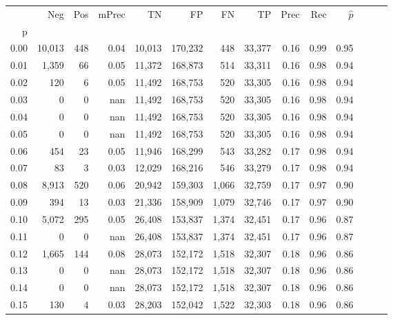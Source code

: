 \begin{tabular}{rrrrrrrrrrrrrr}
\toprule
{} &     Neg &    Pos & mPrec &       TN &       FP &      FN &      TP &  Prec &   Rec & $\hat{p}$ \\
p    &         &        &       &          &          &         &         &       &       &           \\
\midrule
0.00 &  10,013 &    448 &  0.04 &   10,013 &  170,232 &     448 &  33,377 &  0.16 &  0.99 &      0.95 \\
0.01 &   1,359 &     66 &  0.05 &   11,372 &  168,873 &     514 &  33,311 &  0.16 &  0.98 &      0.94 \\
0.02 &     120 &      6 &  0.05 &   11,492 &  168,753 &     520 &  33,305 &  0.16 &  0.98 &      0.94 \\
0.03 &       0 &      0 &   nan &   11,492 &  168,753 &     520 &  33,305 &  0.16 &  0.98 &      0.94 \\
0.04 &       0 &      0 &   nan &   11,492 &  168,753 &     520 &  33,305 &  0.16 &  0.98 &      0.94 \\
0.05 &       0 &      0 &   nan &   11,492 &  168,753 &     520 &  33,305 &  0.16 &  0.98 &      0.94 \\
0.06 &     454 &     23 &  0.05 &   11,946 &  168,299 &     543 &  33,282 &  0.17 &  0.98 &      0.94 \\
0.07 &      83 &      3 &  0.03 &   12,029 &  168,216 &     546 &  33,279 &  0.17 &  0.98 &      0.94 \\
0.08 &   8,913 &    520 &  0.06 &   20,942 &  159,303 &   1,066 &  32,759 &  0.17 &  0.97 &      0.90 \\
0.09 &     394 &     13 &  0.03 &   21,336 &  158,909 &   1,079 &  32,746 &  0.17 &  0.97 &      0.90 \\
0.10 &   5,072 &    295 &  0.05 &   26,408 &  153,837 &   1,374 &  32,451 &  0.17 &  0.96 &      0.87 \\
0.11 &       0 &      0 &   nan &   26,408 &  153,837 &   1,374 &  32,451 &  0.17 &  0.96 &      0.87 \\
0.12 &   1,665 &    144 &  0.08 &   28,073 &  152,172 &   1,518 &  32,307 &  0.18 &  0.96 &      0.86 \\
0.13 &       0 &      0 &   nan &   28,073 &  152,172 &   1,518 &  32,307 &  0.18 &  0.96 &      0.86 \\
0.14 &       0 &      0 &   nan &   28,073 &  152,172 &   1,518 &  32,307 &  0.18 &  0.96 &      0.86 \\
0.15 &     130 &      4 &  0.03 &   28,203 &  152,042 &   1,522 &  32,303 &  0.18 &  0.96 &      0.86 \\

\end{tabular}
